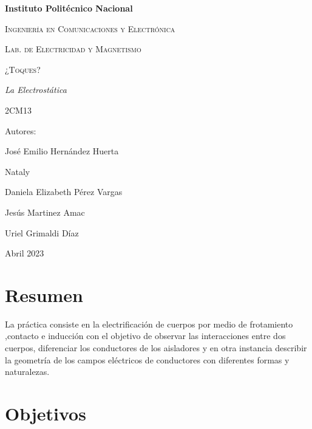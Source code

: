 \documentclass[14pt]{article}
\begin{document}
	\lhead{}
	\begin{titlepage}
		\begin{figure}[t]
			\hspace{0.6\textwidth}
		\end{figure}
		\centering
		{\bfseries\Huge Instituto Politécnico Nacional \par}
		\vspace{1cm}
		{\scshape\Large Ingeniería en Comunicaciones y Electrónica \par}
		\vspace{0.3cm}
		{\scshape\Large Lab. de Electricidad y Magnetismo  \par}
		\vspace{1cm}
		{\scshape\Huge ¿Toques? \par}
		\vspace{1cm}
		{\itshape\Large La Electrostática\par}
		{\Large 2CM13\par}
		\vfill
		{\Large Autores: \par}
		{\Large José Emilio Hernández Huerta \par}
		{\Large Nataly \par}
		{\Large Daniela Elizabeth Pérez Vargas \par}
		{\Large Jesús Martinez Amac\par}
		{\Large Uriel Grimaldi Díaz  \par}
		\vfill
		{\Large Abril 2023 \par}
	\end{titlepage}
	 \tableofcontents
	 
	\newpage
	\section{Resumen}
	La práctica consiste en la electrificación de cuerpos por medio de frotamiento ,contacto e inducción con el objetivo de observar las interacciones entre dos cuerpos, diferenciar los conductores de los aisladores y en otra instancia describir la geometría de los campos eléctricos de conductores con diferentes formas y naturalezas.
	\section{Objetivos} 
\end{document}
